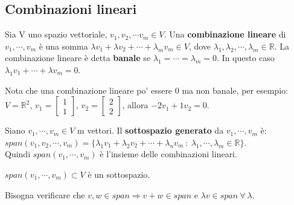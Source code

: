 \subsection{Combinazioni lineari}
\begin{definition}
Sia V uno spazio vettoriale, $v_1, v_2, \cdots v_m \in V$. Una \textbf{combinazione lineare} di $v_1, \cdots, v_m$ è una somma $\lambda v_1+ \lambda v_2 + \cdots + \lambda_m v_m \in V$, dove $\lambda_1, \lambda_2, \cdots, \lambda_m \in \mathbb{R}$. La combinazione lineare è detta \textbf{banale} se $\lambda_1 = \cdots = \lambda_m = 0$. In questo caso $\lambda_1 v_1 + \cdots + \lambda v_m = 0$.
\end{definition}

\hspace{-15pt}Nota che una combinazione lineare po' essere 0 ma non banale, per esempio:\\
$V = \mathbb{R}^2$, \hspace{.2cm} $v_1 = \begin{bmatrix}1\\1\end{bmatrix}$, $v_2 = \begin{bmatrix}2\\2\end{bmatrix}$, \hspace{.2cm}allora $-2v_1 + 1v_2 = 0$.

\begin{definition}
Siano $v_1, \cdots, v_m \in V$ m vettori. Il \textbf{sottospazio generato} da $v_1, \cdots, v_m$ è: $span(v_1, v_2, \cdots, v_m) = \{\lambda_1 v_1 + \lambda_2 v_2 + \cdots + \lambda_n v_m \: : \: \lambda_{1}, \cdots, \lambda_m \in \mathbb{R}\}$.\\
Quindi $span(v_1, \cdots, v_m)$ è l'insieme delle combinazioni lineari.
\end{definition}

\begin{proposition}
$span(v_1, \cdots, v_m) \subset V$ è un sottospazio.
\end{proposition}

\begin{demostration}
Bisogna verificare che $v, w \in span \Longrightarrow v + w \in span$ e $\lambda v \in span \: \forall \: \lambda$.
\end{demostration}

